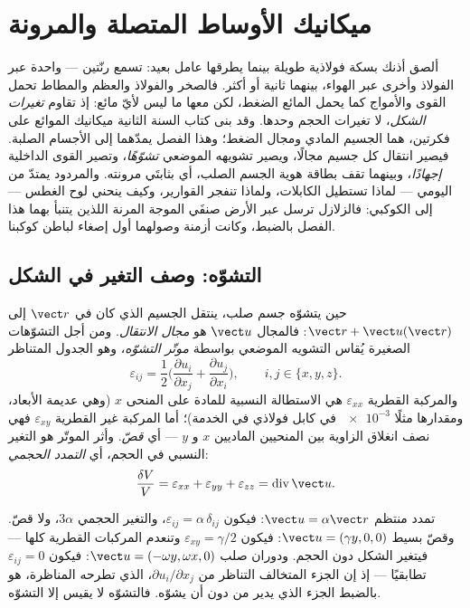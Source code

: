 \chapter{ميكانيك الأوساط المتصلة والمرونة}\label{ch:b3:continuum-elasticity}

ألصق أذنك بسكة فولاذية طويلة بينما يطرقها عامل بعيد: تسمع
رنّتين --- واحدة عبر الفولاذ وأخرى عبر الهواء، بينهما ثانية أو
أكثر. فالصخر والفولاذ والعظم والمطاط تحمل القوى والأمواج كما
يحمل المائع الضغط، لكن معها ما ليس لأيّ مائع: إذ تقاوم
\emph{تغيرات الشكل}، لا تغيرات الحجم وحدها. وقد بنى كتاب السنة
الثانية ميكانيك الموائع على فكرتين، هما الجسيم المادي ومجال
الضغط؛ وهذا الفصل يمدّهما إلى الأجسام الصلبة. فيصير انتقال كل
جسيم مجالًا، ويصير تشويهه الموضعي \emph{تشوّهًا}، وتصير القوى
الداخلية \emph{إجهادًا}، وبينهما تقف بطاقة هوية الجسم الصلب، أي
 بثابتَي مرونته. والمردود يمتدّ من اليومي --- لماذا
تستطيل الكابلات، ولماذا تنفجر القوارير، وكيف ينحني لوح الغطس ---
إلى الكوكبي: فالزلازل ترسل عبر الأرض صنفَي الموجة المرنة اللذين
يتنبأ بهما هذا الفصل بالضبط، وكانت أزمنة وصولهما أول إصغاء
لباطن كوكبنا.

\section{التشوّه: وصف التغير في الشكل}

\begin{definition}\label{def:b3:continuum-elasticity:strain}
حين يتشوّه جسم صلب، ينتقل الجسيم الذي كان في $\vect r$ إلى
$\vect r + \vect u(\vect r)$: فالمجال $\vect u$ هو \emph{مجال
الانتقال}. ومن أجل التشوّهات الصغيرة يُقاس التشويه الموضعي
بواسطة \emph{موتّر التشوّه}، وهو الجدول المتناظر
\[
\varepsilon_{ij} = \frac12\Big(
 \frac{\partial u_i}{\partial x_j} + \frac{\partial u_j}{\partial x_i}
\Big) , \qquad i, j \in \{x, y, z\} .
\]
والمركبة القطرية $\varepsilon_{xx}$ هي الاستطالة النسبية للمادة
على المنحى $x$ (وهي عديمة الأبعاد، ومقدارها مثلًا $\num{e-3}$ في
كابل فولاذي في الخدمة)؛ أما المركبة غير القطرية $\varepsilon_{xy}$
فهي نصف انغلاق الزاوية بين المنحيين الماديين $x$ و $y$
--- أي \emph{قصّ}. وأثر الموتّر هو التغير النسبي في الحجم، أي
\emph{التمدد الحجمي}:
\[
\frac{\delta V}{V} = \varepsilon_{xx} + \varepsilon_{yy} +
\varepsilon_{zz} = \operatorname{div}\vect u .
\]
\end{definition}

\begin{example}\label{ex:b3:continuum-elasticity:elementary}
تمدد منتظم $\vect u = \alpha\vect r$: فيكون $\varepsilon_{ij} =
\alpha\,\delta_{ij}$، والتغير الحجمي $3\alpha$، ولا قصّ. وقصّ بسيط
$\vect u = (\gamma y, 0, 0)$: فيكون $\varepsilon_{xy} = \gamma/2$
وتنعدم المركبات القطرية كلها --- فيتغير الشكل دون الحجم. ودوران
صلب $\vect u = (-\omega y, \omega x, 0)$: فيكون $\varepsilon_{ij} = 0$
تطابقيًا --- إذ إن الجزء المتخالف التناظر من $\partial u_i/\partial x_j$،
الذي تطرحه المناظرة، هو بالضبط الجزء الذي يدير من دون أن يشوّه.
فالتشوّه لا يقيس إلا التشوّه.
\end{example}


